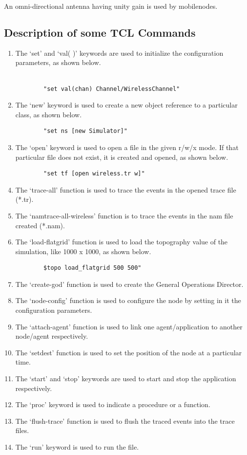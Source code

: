 \documentclass[11pt]{article}
\begin{document}
An omni-directional antenna having unity gain is used by mobilenodes.



\subsection{Description of some TCL Commands}

\begin{enumerate}
    \item The ‘set’ and ‘val( )’ keywords are used to initialize the configuration parameters, as shown below.
          \begin{verbatim}
        
        "set val(chan) Channel/WirelessChannel"
    \end{verbatim}
    \item The ‘new’ keyword is used to create a new object reference to a particular class, as shown below.
          \begin{verbatim}
        "set ns [new Simulator]"
          \end{verbatim}
    \item The ‘open’ keyword is used to open a file in the given r/w/x mode. If that particular file does not exist,
          it is created and opened, as shown below.
          \begin{verbatim}
        "set tf [open wireless.tr w]"
          \end{verbatim}
    \item The ‘trace-all’ function is used to trace the events in the opened trace file (*.tr).
    \item The ‘namtrace-all-wireless’ function is to trace the events in the nam file created (*.nam).
    \item The ‘load-flatgrid’ function is used to load the topography value of the simulation, like 1000 x 1000,
          as shown below.
          \begin{verbatim}
        $topo load_flatgrid 500 500"
          \end{verbatim}
    \item The ‘create-god’ function is used to create the General Operations Director.
    \item The ‘node-config’ function is used to configure the node by setting in it the configuration parameters.
    \item The ‘attach-agent’ function is used to link one agent/application to another node/agent respectively.
    \item The ‘setdest’ function is used to set the position of the node at a particular time.
    \item The ‘start’ and ‘stop’ keywords are used to start and stop the application respectively.
    \item The ‘proc’ keyword is used to indicate a procedure or a function.
    \item The ‘flush-trace’ function is used to flush the traced events into the trace files.
    \item The ‘run’ keyword is used to run the file.
\end{enumerate}
\end{document}

